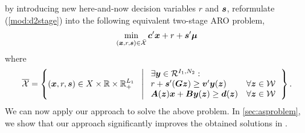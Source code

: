 \documentclass[fleqn,orsc,blindrev]{informs4}
\newcommand{\mb}[1]{\mbox{\boldmath \ensuremath{#1}}}
\begin{document}
		by introducing new here-and-now decision variables $r$ and $\mb{s}$, \cite{bsz17} reformulate (\ref{mod:d2stage}) into the following equivalent two-stage ARO problem,
\begin{equation*}
		\min_{(\boldsymbol{x}, r, \boldsymbol{s})  \in \bar{\mathcal{X}}}  \mb{c}'\mb{x} +  r+\mb{s}{'}\mb{\mu}
\end{equation*}
		where
\begin{equation*}
			\overline{\mathcal{X}} = \left\{ (\mb{x},r,\mb{s}) \in X \times \mathbb{R} \times  \mathbb{R}^{L_1}_+ \ \hspace{3pt} \left|  
			\hspace{3pt} 
			\begin{array}{ll}
				\exists \mb{y} \in \mathcal{R}^{I_1,N_2}: \\
				r+\mb{s}{'}(\mb{G}\mb{z}) \geq \mb{v}'\mb{y}(\mb{z}) &  \forall \mb{z} \in \mathcal{W} \\
				\mb{A}(\mb{z})\mb{x}+\mb{B}\mb{y}(\mb{z}) \geq\mb{d}(\mb{z}) &   \forall \mb{z} \in \mathcal{W} 
			\end{array} \right.
			\right\}.
\end{equation*}
		We can now apply our approach to solve the above problem.  In \textsection \ref{sec:asproblem},  we show that our approach significantly improves the obtained solutions in \cite{bsz17}.
		
\end{document}
